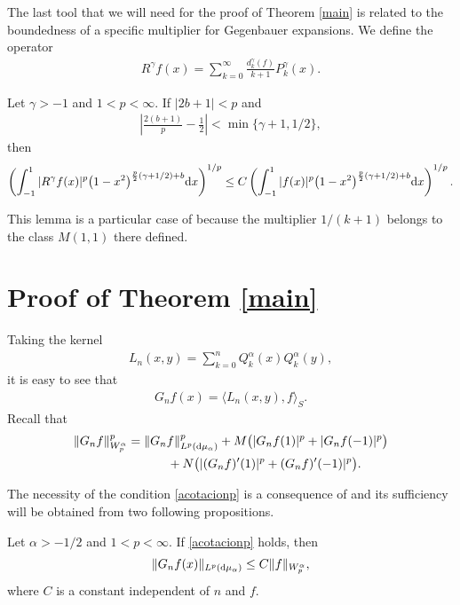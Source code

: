 The last tool that we will need for the proof of Theorem \ref{main} is related to the boundedness of a specific multiplier for Gegenbauer expansions. We define the operator
\begin{gather*}
R^\gamma f(x)=\sum_{k=0}^\infty \frac{d_k^\gamma(f)}{k+1}P_{k}^\gamma(x).
\end{gather*}
\begin{lem}\label{lem:muck}
Let $\gamma>-1$ and $1<p<\infty$. If $|2b+1|<p$ and
\begin{gather*}
\left|\frac{2(b+1)}{p}-\frac{1}{2}\right|<\min\{\gamma+1,1/2\},
\end{gather*}
then	
	\begin{gather*}%
	\left(\int_{-1}^{1}|R^\gamma f(x)|^p\big(1-x^2\big)^{\frac{p}{2}(\gamma+1/2)+b} {\rm d}x\right)^{1/p} \le C\left(\int_{-1}^{1}|f(x)|^p\big(1-x^2\big)^{\frac{p}{2}(\gamma+1/2)+b} {\rm d}x\right)^{1/p}.
	\end{gather*}
\end{lem}

This lemma is a particular case of \cite[Theorem~1.10]{muckenhoupt} because the multiplier $1/(k+1)$ belongs to the class $M(1,1)$ there defined.

\section{Proof of Theorem \ref{main}}\label{section3}
Taking the kernel
\begin{gather*}
L_n(x,y)=\sum_{k=0}^n Q_k^{\alpha}(x)Q_k^{\alpha}(y),
\end{gather*}
it is easy to see that
\begin{gather*}
G_nf(x)=\langle L_n(x,y),f\rangle_S.
\end{gather*}
Recall that
\begin{gather*}
\|G_nf\|_{W_p^{\alpha}}^p=\|G_nf\|_{L^p({\rm d}\mu_{\alpha})}^p+M\big(|G_nf(1)|^p+|G_nf(-1)|^p\big)\\
\hphantom{\|G_nf\|_{W_p^{\alpha}}^p=}{} +N\big(|(G_nf)'(1)|^p+(G_nf)'(-1)|^p\big).
\end{gather*}

The necessity of the condition \eqref{acotacionp} is a consequence of \cite[Theorem 1]{Fejzullahu} and its sufficiency will be obtained from two following propositions.
\begin{propo}\label{prop1} Let $\alpha>-1/2$ and $1<p<\infty$. If \eqref{acotacionp} holds, then
	\begin{gather}\label{des-1}
	\|G_nf(x)\|_{L^p({\rm d}\mu_{\alpha})}\le C\|f\|_{{W_p^{\alpha}}},
	\end{gather}
where $C$ is a constant independent of $n$ and $f$.
\end{propo}

